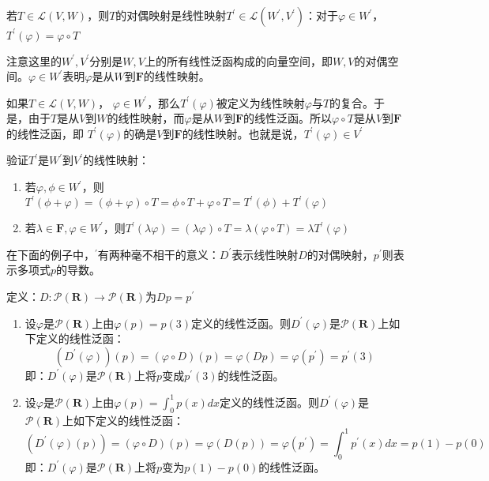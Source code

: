 \documentclass[10pt,a4paper,UTF8]{article}
\begin{document}
\begin{definition}
若\(T\in \mathcal{L}(V,W)\)，则\(T\)的对偶映射是线性映射\(T^{'} \in \mathcal{L}(W^{'},V^{'})\)：对于\(\varphi \in W^{'}\)， \(T^{'}(\varphi) = \varphi \circ T\)
\end{definition}

注意这里的\(W^{'},V^{'}\)分别是\(W,V\)上的所有线性泛函构成的向量空间，即\(W,V\)的对偶空间。\(\varphi\in W^{'}\)表明\(\varphi\)是从\(W\)到\(\mathbf{F}\)的线性映射。


如果\(T\in \mathcal{L}(V,W)\)， \(\varphi \in W^{'}\)，那么\(T^{'}(\varphi)\)被定义为线性映射\(\varphi\)与\(T\)的复合。于是，由于\(T\)是从\(V\)到\(W\)的线性映射，而\(\varphi\)是从\(W\)到\(\mathbf{F}\)的线性泛函。所以\(\varphi\circ T\)是从\(V\)到\(\mathbf{F}\)的线性泛函，即 \(T^{'}(\varphi)\)的确是\(V\)到\(\mathbf{F}\)的线性映射。也就是说，\(T^{'}(\varphi)\in V^{'}\)

验证\(T^{'}\)是\(W^{'}\)到\(V^{'}\)的线性映射：
\begin{enumerate}
\item 若\(\varphi,\phi \in W^{'}\)，则\(T^{'}(\phi + \varphi) = ( \phi + \varphi )\circ T = \phi \circ T + \varphi \circ T = T^{'}(\phi) + T^{'}(\varphi)\)
\item 若\(\lambda \in \mathbf{F}, \varphi\in W^{'}\)，则\(T^{'}(\lambda\varphi) = (\lambda\varphi)\circ T = \lambda(\varphi\circ T) = \lambda T^{'}(\varphi)\)
\end{enumerate}

在下面的例子中，\(^{'}\)有两种毫不相干的意义：\(D^{'}\)表示线性映射\(D\)的对偶映射，\(p^{'}\)则表示多项式\(p\)的导数。

\begin{instance}
定义：\(D: \mathcal{P}(\mathbf{R}) \rightarrow \mathcal{P}(\mathbf{R})\)为\(Dp = p^{'}\)
\begin{enumerate}
\item 设\(\varphi\)是\(\mathcal{P}(\mathbf{R})\)上由\(\varphi(p) = p(3)\)定义的线性泛函。则\(D^{'}(\varphi)\)是\(\mathcal{P}(\mathbf{R})\)上如下定义的线性泛函：\[(D^{'}(\varphi))(p) =(\varphi\circ D)(p) = \varphi(Dp) = \varphi(p^{'}) = p^{'}(3) \]即：\(D^{'}(\varphi)\)是\(\mathcal{P}(\mathbf{R})\)上将\(p\)变成\(p^{'}(3)\)的线性泛函。
\item 设\(\varphi\)是\(\mathcal{P}(\mathbf{R})\)上由\(\varphi(p) = \int_{0}^{1}p(x)dx\)定义的线性泛函。则\(D^{'}(\varphi)\)是\(\mathcal{P}(\mathbf{R})\)上如下定义的线性泛函：\[(D^{'}(\varphi)(p)) = (\varphi\circ D)(p) = \varphi(D(p)) = \varphi(p^{'}) = \int_{0}^{1} p^{'}(x)dx = p(1) - p(0)\]即：\(D^{'}(\varphi)\)是\(\mathcal{P}(\mathbf{R})\)上将\(p\)变为\(p(1)-p(0)\)的线性泛函。
\end{enumerate}
\end{instance}
\end{document}

